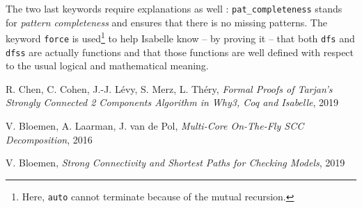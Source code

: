 \documentclass[a4 paper, 12pt]{article}
\theoremstyle{definition}
\begin{document}
The two last keywords require explanations as well : \texttt{pat\_completeness} stands for \textit{pattern completeness} and ensures that there is no missing patterns. The keyword \texttt{force} is used\footnote{Here, \texttt{auto} cannot terminate because of the mutual recursion.} to help Isabelle know -- by proving it -- that both \texttt{dfs} and \texttt{dfss} are actually functions and that those functions are well defined with respect to the usual logical and mathematical meaning.

\pagebreak

\begin{thebibliography}{99}

 R. Chen, C. Cohen, J.-J. Lévy, S. Merz, L. Théry, \emph{Formal Proofs of Tarjan’s Strongly Connected 2 Components Algorithm in Why3, Coq and Isabelle}, 2019

 V. Bloemen, A. Laarman, J. van de Pol, \emph{Multi-Core On-The-Fly SCC Decomposition}, 2016

 V. Bloemen, \emph{Strong Connectivity and Shortest Paths for Checking Models}, 2019

\end{thebibliography}
\end{document}
